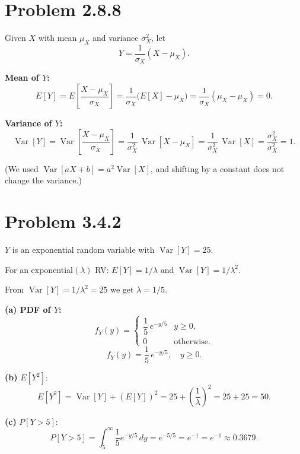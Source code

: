 \documentclass[11pt]{article}
\newcommand{\Var}{\operatorname{Var}}
\begin{document}
\section*{Problem 2.8.8}

Given $X$ with mean $\mu_X$ and variance $\sigma_X^2$, let
\[
Y = \frac{1}{\sigma_X}(X-\mu_X).
\]

\textbf{Mean of $Y$:}
\[
E[Y] = E\!\left[\frac{X-\mu_X}{\sigma_X}\right] = \frac{1}{\sigma_X}\bigl(E[X]-\mu_X\bigr) = \frac{1}{\sigma_X}(\mu_X - \mu_X) = \boxed{0}.
\]

\textbf{Variance of $Y$:}
\[
\Var[Y] = \Var\!\left[\frac{X-\mu_X}{\sigma_X}\right] = \frac{1}{\sigma_X^2}\,\Var[X-\mu_X] = \frac{1}{\sigma_X^2}\,\Var[X] = \frac{\sigma_X^2}{\sigma_X^2} = \boxed{1}.
\]

(We used $\Var[aX+b]=a^2\Var[X]$, and shifting by a constant does not change the variance.)

\section*{Problem 3.4.2}

$Y$ is an exponential random variable with $\Var[Y]=25$.

For an exponential$(\lambda)$ RV: $E[Y]=1/\lambda$ and $\Var[Y]=1/\lambda^2$.

From $\Var[Y]=1/\lambda^2=25$ we get $\lambda = 1/5$.

\medskip
\textbf{(a) PDF of $Y$:}
\[
f_Y(y) = \begin{cases}\dfrac{1}{5}\,e^{-y/5} & y\ge 0,\\[6pt] 0 & \text{otherwise.}\end{cases}
\]
\[
\boxed{f_Y(y)=\frac{1}{5}\,e^{-y/5},\quad y\ge 0.}
\]

\textbf{(b)} $E[Y^2]$:
\[
E[Y^2] = \Var[Y]+(E[Y])^2 = 25 + \left(\frac{1}{\lambda}\right)^2 = 25+25 = \boxed{50}.
\]

\textbf{(c)} $P[Y>5]$:
\[
P[Y>5] = \int_5^{\infty}\frac{1}{5}e^{-y/5}\,dy = e^{-5/5} = e^{-1} = \boxed{e^{-1}\approx 0.3679}.
\]

\end{document}
